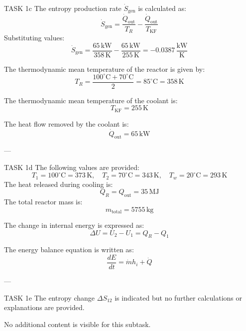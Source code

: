 TASK 1c  
The entropy production rate \( \dot{S}_{\text{gen}} \) is calculated as:  
\[
\dot{S}_{\text{gen}} = \frac{\dot{Q}_{\text{out}}}{T_R} - \frac{\dot{Q}_{\text{out}}}{T_{\text{KF}}}
\]  
Substituting values:  
\[
\dot{S}_{\text{gen}} = \frac{65 \, \text{kW}}{358 \, \text{K}} - \frac{65 \, \text{kW}}{255 \, \text{K}} = -0.0387 \, \frac{\text{kW}}{\text{K}}
\]  

The thermodynamic mean temperature of the reactor is given by:  
\[
T_R = \frac{100^\circ\text{C} + 70^\circ\text{C}}{2} = 85^\circ\text{C} = 358 \, \text{K}
\]  

The thermodynamic mean temperature of the coolant is:  
\[
T_{\text{KF}} = 255 \, \text{K}
\]  

The heat flow removed by the coolant is:  
\[
\dot{Q}_{\text{out}} = 65 \, \text{kW}
\]  

---

TASK 1d  
The following values are provided:  
\[
T_1 = 100^\circ\text{C} = 373 \, \text{K}, \quad T_2 = 70^\circ\text{C} = 343 \, \text{K}, \quad T_w = 20^\circ\text{C} = 293 \, \text{K}
\]  
The heat released during cooling is:  
\[
Q_R = Q_{\text{out}} = 35 \, \text{MJ}
\]  
The total reactor mass is:  
\[
m_{\text{total}} = 5755 \, \text{kg}
\]  

The change in internal energy is expressed as:  
\[
\Delta U = U_2 - U_1 = Q_R - Q_1
\]  

The energy balance equation is written as:  
\[
\frac{dE}{dt} = \dot{m} h_i + \dot{Q}
\]  

---

TASK 1e  
The entropy change \( \Delta S_{12} \) is indicated but no further calculations or explanations are provided.  

No additional content is visible for this subtask.